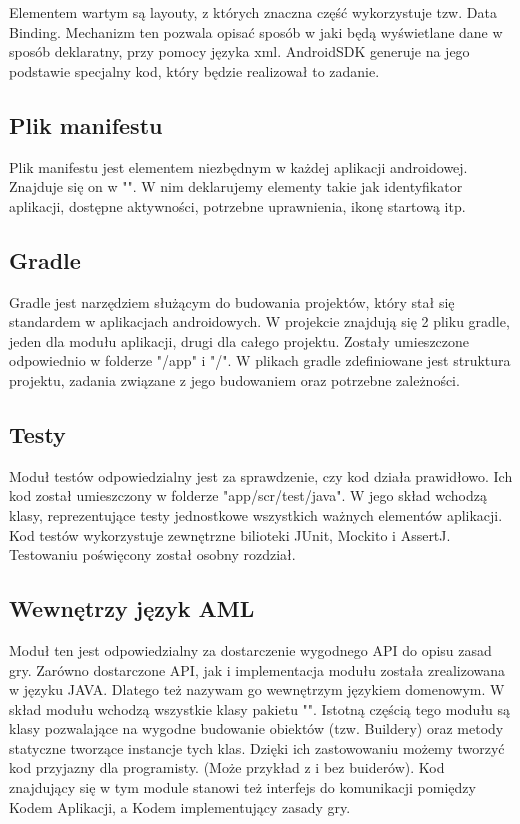 \documentclass	{xmgr}
\begin{document}
Elementem wartym są layouty, z których znaczna część wykorzystuje tzw. Data Binding. Mechanizm ten pozwala opisać sposób w jaki będą wyświetlane dane w sposób deklaratny, przy pomocy języka xml. AndroidSDK generuje na jego podstawie specjalny kod, który będzie realizował to zadanie. 


\subsection{Plik manifestu}
Plik manifestu jest elementem niezbędnym w każdej aplikacji androidowej. Znajduje się on w "". W nim deklarujemy elementy takie jak identyfikator aplikacji, dostępne aktywności, potrzebne uprawnienia, ikonę startową itp.

\subsection{Gradle}
Gradle jest narzędziem służącym do budowania projektów, który stał się standardem w aplikacjach androidowych. W projekcie znajdują się 2 pliku gradle, jeden dla modułu aplikacji, drugi dla całego projektu. Zostały umieszczone odpowiednio w folderze "/app" i "/". W plikach gradle zdefiniowane jest struktura projektu, zadania związane z jego budowaniem oraz potrzebne zależności.

\subsection{Testy}
Moduł testów odpowiedzialny jest za sprawdzenie, czy kod działa prawidłowo. Ich kod został umieszczony w folderze "app/scr/test/java". W jego skład wchodzą klasy, reprezentujące testy jednostkowe wszystkich ważnych elementów aplikacji. Kod testów wykorzystuje zewnętrzne bilioteki JUnit, Mockito i AssertJ. Testowaniu poświęcony został osobny rozdział.

\subsection{Wewnętrzy język AML}
Moduł ten jest odpowiedzialny za dostarczenie wygodnego API do opisu zasad gry. Zarówno dostarczone API, jak i implementacja modułu została zrealizowana w języku JAVA. Dlatego też nazywam go wewnętrzym językiem domenowym.
W skład modułu wchodzą wszystkie klasy pakietu "".
Istotną częścią tego modułu są klasy pozwalające na wygodne budowanie obiektów (tzw. Buildery) oraz metody statyczne tworzące instancje tych klas. Dzięki ich zastowowaniu możemy tworzyć kod przyjazny dla programisty. (Może przykład z i bez buiderów).
Kod znajdujący się w tym module stanowi też interfejs do komunikacji pomiędzy Kodem Aplikacji, a Kodem implementujący zasady gry.
\end{document}
